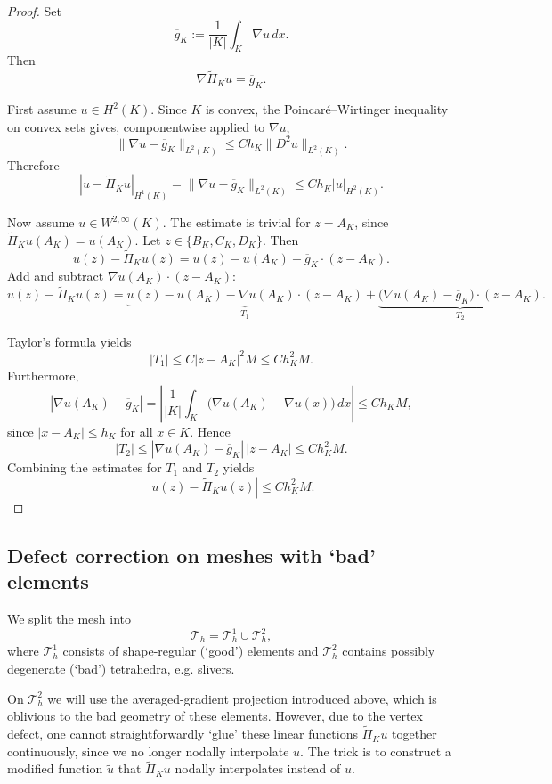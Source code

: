 \documentclass{article}
\begin{document}
\begin{proof}
Set
\[
\overline g_K:=\frac{1}{|K|}\int_K \nabla u\,dx .
\]
Then
\[
\nabla \widetilde{\Pi}_K u=\overline g_K.
\]

First assume \(u\in H^2(K)\). Since \(K\) is convex, the Poincaré--Wirtinger
inequality on convex sets gives, componentwise applied to \(\nabla u\),
\[
\|\nabla u-\overline g_K\|_{L^2(K)}
\le C h_K \|D^2u\|_{L^2(K)} .
\]
Therefore
\[
|u-\widetilde{\Pi}_K u|_{H^1(K)}
= \|\nabla u-\overline g_K\|_{L^2(K)}
\le C h_K |u|_{H^2(K)} .
\]

Now assume \(u\in W^{2,\infty}(K)\). The estimate is trivial for
\(z=A_K\), since \(\widetilde{\Pi}_K u(A_K)=u(A_K)\). Let
\(z\in\{B_K,C_K,D_K\}\). Then
\[
u(z)-\widetilde{\Pi}_K u(z) = u(z)-u(A_K)-\overline g_K\cdot (z-A_K).
\]
Add and subtract \(\nabla u(A_K)\cdot (z-A_K)\):
\[
u(z)-\widetilde{\Pi}_K u(z)
=\underbrace{u(z)-u(A_K)-\nabla u(A_K)\cdot (z-A_K)}_{T_1} +\underbrace{\bigl(\nabla u(A_K)-\overline g_K\bigr)\cdot (z-A_K)}_{T_2}.
\]


\noindent Taylor's formula yields
\[
|T_1| \le C |z-A_K|^2 M \le C h_K^2 M.
\]
Furthermore,
\[
|\nabla u(A_K)-\overline g_K|
= \left|\frac{1}{|K|}\int_K \bigl(\nabla u(A_K)-\nabla u(x)\bigr)\,dx
\right| \le C h_K M,
\]
since \(|x-A_K|\le h_K\) for all \(x\in K\). Hence
\[
|T_2| \le |\nabla u(A_K)-\overline g_K|\,|z-A_K| \le C h_K^2 M.
\]
Combining the estimates for \(T_1\) and \(T_2\) yields
\[
|u(z)-\widetilde{\Pi}_K u(z)|
\le C h_K^2 M.
\]
\end{proof}





\subsection{Defect correction on meshes with `bad' elements}
We split the mesh into
\[
\mathcal{T}_h = \mathcal{T}_h^1 \cup \mathcal{T}_h^2,
\]
where $\mathcal{T}_h^1$ consists of shape-regular (`good') elements and $\mathcal{T}_h^2$ contains possibly degenerate (`bad') tetrahedra, e.g. slivers. 

On $\mathcal{T}_h^2$ we will use the averaged-gradient projection introduced above, which is oblivious to the bad geometry of these elements. However, due to the vertex defect, one cannot straightforwardly `glue' these linear functions $\widetilde{\Pi}_Ku$ together continuously, since we no longer nodally interpolate $u$. The trick is to construct a modified function $\tilde{u}$ that $\widetilde{\Pi}_Ku$ nodally interpolates instead of $u$.
\end{document}
